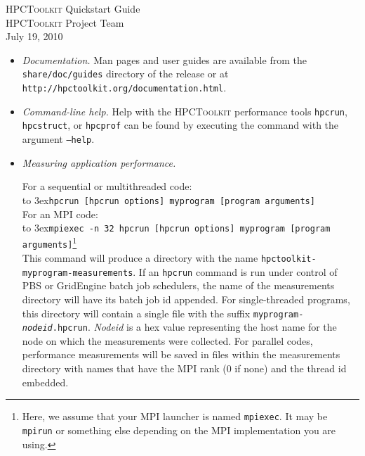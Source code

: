 \documentclass[10pt]{article}
\newcommand{\HPCToolkit}{\textsc{HPCToolkit}}
\begin{document}


\newcommand\lindent{\hbox to 3ex{\hfil}}


\begin{center}
{\Large \HPCToolkit{} Quickstart Guide}\\[1ex]
{\HPCToolkit{} Project Team}\\
July 19, 2010
\end{center}



\begin{itemize}
\item{\em Documentation.} Man pages and user guides are available from the {\tt share/doc/guides} directory of the release or at {\tt http://hpctoolkit.org/documentation.html}.  

\item {\em Command-line help.} Help with the \HPCToolkit{} performance tools {\tt hpcrun}, {\tt hpcstruct}, or {\tt hpcprof} can be found by executing the command with the argument {\tt --help}.

\item{ \em Measuring application performance.}

For a sequential or multithreaded code:\\
\lindent {\tt hpcrun [hpcrun options] myprogram [program arguments] }\\[1ex]
For an MPI code:\\
\lindent {\tt mpiexec -n 32 hpcrun [hpcrun options] myprogram [program arguments]}\footnote{Here, we assume that your MPI launcher is named {\tt mpiexec}. It may be {\tt mpirun} or something else depending on the MPI implementation you are using.}\\[1ex]
\sloppy This command will produce a directory with the name {\tt hpctoolkit-myprogram-measurements}. If an {\tt hpcrun} command is run under control of PBS or GridEngine batch job schedulers, the name of the measurements directory will have its batch job id appended. For single-threaded programs, this directory will contain a single file with the suffix {\tt myprogram-{\em nodeid}.hpcrun}. {\em Nodeid} is a hex value representing the host name for the node on which the measurements were collected. For parallel codes, performance measurements will be saved in files within the measurements directory with names that have the MPI rank (0 if none) and the thread id embedded.


\end{itemize}
\end{document}

